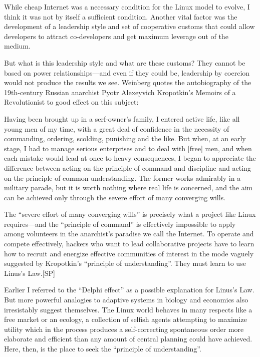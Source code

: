 \documentclass[a4paper,12pt,UTF8,twoside]{ctexbook}
\begin{document}
While cheap Internet was a necessary condition for the Linux model to evolve, I think it was not by itself a sufficient condition. Another vital factor was the development of a leadership style and set of cooperative customs that could allow developers to attract co-developers and get maximum leverage out of the medium.

But what is this leadership style and what are these customs? They cannot be based on power relationships—and even if they could be, leadership by coercion would not produce the results we see. Weinberg quotes the autobiography of the 19th-century Russian anarchist Pyotr Alexeyvich Kropotkin's Memoirs of a Revolutionist to good effect on this subject:

Having been brought up in a serf-owner's family, I entered active life, like all young men of my time, with a great deal of confidence in the necessity of commanding, ordering, scolding, punishing and the like. But when, at an early stage, I had to manage serious enterprises and to deal with [free] men, and when each mistake would lead at once to heavy consequences, I began to appreciate the difference between acting on the principle of command and discipline and acting on the principle of common understanding. The former works admirably in a military parade, but it is worth nothing where real life is concerned, and the aim can be achieved only through the severe effort of many converging wills.

The ``severe effort of many converging wills'' is precisely what a project like Linux requires—and the ``principle of command'' is effectively impossible to apply among volunteers in the anarchist's paradise we call the Internet. To operate and compete effectively, hackers who want to lead collaborative projects have to learn how to recruit and energize effective communities of interest in the mode vaguely suggested by Kropotkin's ``principle of understanding''. They must learn to use Linus's Law.[SP]

Earlier I referred to the ``Delphi effect'' as a possible explanation for Linus's Law. But more powerful analogies to adaptive systems in biology and economics also irresistably suggest themselves. The Linux world behaves in many respects like a free market or an ecology, a collection of selfish agents attempting to maximize utility which in the process produces a self-correcting spontaneous order more elaborate and efficient than any amount of central planning could have achieved. Here, then, is the place to seek the ``principle of understanding''.
\end{document}
